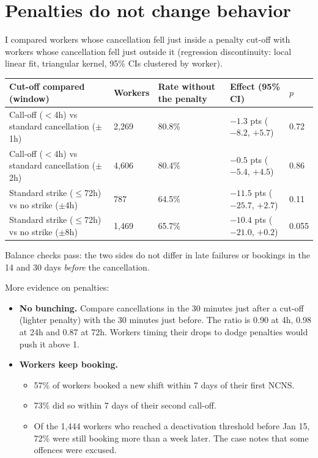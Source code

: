 \documentclass[11pt]{article}
\newcommand{\lthan}{\ensuremath{<}}
\begin{document}
\section{Penalties do not change behavior}
I compared workers whose cancellation fell just inside a penalty cut-off with workers whose cancellation fell just
outside it (regression discontinuity: local linear fit, triangular kernel, 95\% CIs clustered by worker).

\begin{center}\small
{}
\begin{tabularx}{\textwidth}{@{}LR{1.3cm}R{2.0cm}R{3.4cm}R{0.9cm}@{}}
\toprule
Cut-off compared (window) & Workers & Rate without the penalty & Effect (95\% CI) & $p$ \\
\midrule
Call-off (\lthan{}4h) vs standard cancellation ($\pm$1h) & 2,269 & 80.8\% & $-1.3$ pts ($-8.2$, $+5.7$) & 0.72 \\
Call-off (\lthan{}4h) vs standard cancellation ($\pm$2h) & 4,606 & 80.4\% & $-0.5$ pts ($-5.4$, $+4.5$) & 0.86 \\
Standard strike ($\le$72h) vs no strike ($\pm$4h) & 787 & 64.5\% & $-11.5$ pts ($-25.7$, $+2.7$) & 0.11 \\
Standard strike ($\le$72h) vs no strike ($\pm$8h) & 1,469 & 65.7\% & $-10.4$ pts ($-21.0$, $+0.2$) & 0.055 \\
\bottomrule
\end{tabularx}
\end{center}

Balance checks pass: the two sides do not differ in late failures or bookings in the 14 and 30 days \emph{before} the
cancellation.

More evidence on penalties:
\begin{itemize}
  \item \textbf{No bunching.} Compare cancellations in the 30 minutes just after a cut-off (lighter penalty) with the 30
  minutes just before. The ratio is 0.90 at 4h, 0.98 at 24h and 0.87 at 72h. Workers timing their drops to dodge
  penalties would push it above 1.
  \item \textbf{Workers keep booking.}
  \begin{itemize}
    \item 57\% of workers booked a new shift within 7 days of their first NCNS.
    \item 73\% did so within 7 days of their second call-off.
    \item Of the 1,444 workers who reached a deactivation threshold before Jan 15, 72\% were still booking more than a
    week later. The case notes that some offences were excused.
  \end{itemize}
\end{itemize}
\end{document}
